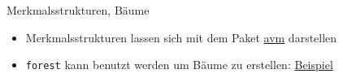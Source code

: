 \begin{frame}[fragile]{Merkmalsstrukturen, Bäume}
    \begin{itemize}[<+->]
        \item Merkmalsstrukturen lassen sich mit dem Paket \href{http://www.essex.ac.uk/linguistics/external/clmt/latex4ling/avms/}{avm} darstellen
        \item \texttt{forest} kann benutzt werden um Bäume zu erstellen: \href{https://www.overleaf.com/3419620fkxwhd#/9651961/}{Beispiel}
    \end{itemize}
\end{frame}
